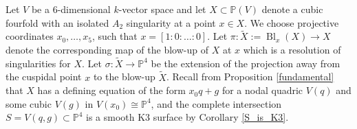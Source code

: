 \documentclass[a4paper, twoside, 11pt]{amsart}
\theoremstyle{definition}
\theoremstyle{remark}
\numberwithin{equation}{theorem}
\DeclareMathOperator{\bl}{Bl}
\begin{document}
Let $V$ be a $6$-dimensional $k$-vector space and let $X \subset \mathbb{P}(V)$ denote a cubic fourfold with an isolated $A_2$ singularity at a point $x\in X$. We choose projective coordinates $x_0,\dots, x_5$, such that $x = [1:0:\dots:0]$. Let $\pi\colon\widetilde{X} := \bl_x(X) \to X$ denote the corresponding map of the blow-up of $X$ at $x$ which is a resolution of singularities for $X$. Let $\sigma \colon \widetilde{X} \to \mathbb{P}^4$ be the extension of the projection away from the cuspidal point $x$ to the blow-up $\widetilde{X}$. Recall from Proposition \ref{fundamental} that $X$ has a defining equation of the form $x_0q+g$ for a nodal quadric $V(q)$ and some cubic $V(g)$ in $V(x_0) \cong \mathbb{P}^4$, and the complete intersection $S = V(q, g) \subset \mathbb{P}^4$ is a smooth K3 surface by Corollary \ref{S_is_K3}.  
\end{document}
